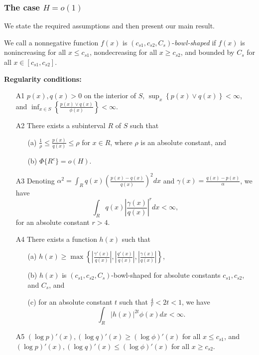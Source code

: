 \documentclass{article}
\begin{document}
\subsubsection{The case $H = o(1)$}

We state the required assumptions and then present our main result.

\begin{definition}
We call a nonnegative function $f(x)$ is $(c_{s1}, c_{s2}, C_s)$-\emph{bowl-shaped} if $f(x)$ is nonincreasing for all $x \leq c_{s1}$, nondecreasing for all $x \geq c_{s2}$, and bounded by $C_s$ for all $x \in [c_{s1}, c_{s2}]$.
\end{definition}

\noindent \textbf{Regularity conditions:} 
\begin{enumerate}
\item[A1] $p(x), q(x) > 0$ on the interior of $S$, $\sup_x \left\{p(x) \vee q(x)\right\} < \infty$, and $\inf_{x \in S} \left\{\frac{p(x) \vee q(x)}{\phi(x)}\right\} < \infty$. 
\item[A2] There exists a subinterval $R$ of $S$ such that
\begin{itemize}
\item[(a)] $\frac{1}{\rho} \leq \frac{p(x)}{q(x)} \leq \rho$ for $x \in R$, where $\rho$ is an absolute constant, and
\item[(b)] $\Phi\{R^c\} = o(H)$.
\end{itemize}

\item[A3] Denoting $\alpha^2 = \int_R q(x) \left( \frac{p(x) - q(x)}{q(x)} \right)^2 dx$ and $\gamma(x) = \frac{q(x) - p(x)}{\alpha}$, we have 
$$\int_R q(x) \left| \frac{\gamma(x)}{q(x)} \right|^r dx  < \infty,$$
for an absolute constant $r > 4$. 
\item[A4] There exists a function $h(x)$ such that
\begin{itemize}
\item[(a)] $h(x) \geq \max \left\{  \left|\frac{\gamma'(x)}{q(x)} \right|,  \left|\frac{q'(x)}{q(x)}\right|, \left | \frac{\gamma(x)}{q(x)} \right|  \right\} $, 
\item[(b)] $h(x)$ is $(c_{s1}, c_{s2}, C_s)$-bowl-shaped for absolute constants $c_{s1}, c_{s2}$, and $C_s$, and
\item[(c)] for an absolute constant $t$ such that $\frac{4}{r} < 2t  < 1$, we have
$$\int_R |h(x)|^{2t} \phi(x) dx < \infty.$$
\end{itemize}

\item[A5]  $(\log p)'(x), (\log q)'(x) \geq (\log \phi)'(x)$ for all $x \leq c_{s1}$, and $ (\log p)'(x), (\log q)'(x) \leq (\log \phi)'(x)$ for all $x \geq c_{s2}$.
\end{enumerate}
\end{document}
